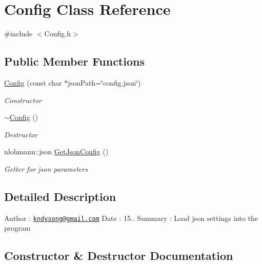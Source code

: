 \hypertarget{class_config}{}\section{Config Class Reference}
\label{class_config}


{\ttfamily \#include $<$Config.\+h$>$}

\subsection*{Public Member Functions}
\begin{DoxyCompactItemize}
\item 
\mbox{\hyperlink{class_config_a3f22d44dfbb1c7a08b62813d52fc8ab3}{Config}} (const char $\ast$json\+Path=\char`\"{}config.\+json\char`\"{})
\begin{DoxyCompactList}\small\item\em Constructor \end{DoxyCompactList}\item 
\mbox{\hyperlink{class_config_a543dce59b66475c5108088ee4ce1cdfc}{$\sim$\+Config}} ()
\begin{DoxyCompactList}\small\item\em Destructor \end{DoxyCompactList}\item 
nlohmann\+::json \mbox{\hyperlink{class_config_aaa1d09459a8874cafe046f069c5eb2bf}{Get\+Json\+Config}} ()
\begin{DoxyCompactList}\small\item\em Getter for json parameters \end{DoxyCompactList}\end{DoxyCompactItemize}


\subsection{Detailed Description}
Author \+: \href{mailto:kndysong@gmail.com}{\tt kndysong@gmail.\+com} Date \+: 15.. Summary \+: Load json settings into the program 

\subsection{Constructor \& Destructor Documentation}
\mbox{\label{class_config_a3f22d44dfbb1c7a08b62813d52fc8ab3}} 
